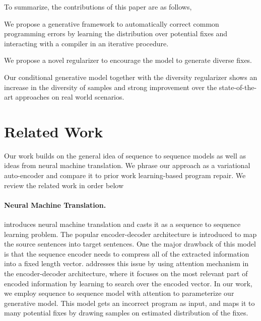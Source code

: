 \documentclass[letterpaper]{article} \usepackage{aaai20}  \usepackage{times}  \usepackage{helvet} \usepackage{courier}  \usepackage[hyphens]{url}  \usepackage{graphicx}
\begin{document}
To summarize, the contributions of this paper are as follows,
\begin{enumerate*}
    \item We  propose a generative framework to automatically correct common programming errors by learning the distribution over potential fixes and interacting with a compiler in an iterative procedure.
    \item We propose a novel regularizer to encourage the model to generate diverse fixes.
    \item Our conditional generative model together with the diversity regularizer shows an increase in the diversity of samples and strong improvement over the state-of-the-art approaches on real world scenarios.
\end{enumerate*}

\section{Related Work}
\label{related_Work}

Our work builds on the general idea of sequence to sequence models as well as ideas from neural machine translation. We phrase our approach as a variational auto-encoder and compare it to prior work learning-based program repair. We review the related work in order below
\paragraph{Neural Machine Translation.}
\citeauthor{sutskever14seq2seq} introduces neural machine translation and casts it as a sequence to sequence learning problem. The popular encoder-decoder architecture is introduced to map the source sentences into target sentences. One the major drawback of this model is that the sequence encoder needs to compress all of the extracted information into a fixed length vector. \cite{Bahdanau2015NeuralMT} addresses this issue by using attention mechanism in the encoder-decoder architecture, where it focuses on the most relevant part of encoded information by learning to search over the encoded vector. In our work, we employ sequence to sequence model with attention to parameterize our generative model. This model gets an incorrect program as input, and maps it to many potential fixes by drawing samples on estimated distribution of the fixes.
\end{document}
